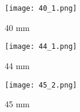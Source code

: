 \begin{figure}[H]
	\centering
	\texttt{[image: 40\_1.png]}
	\caption{40 mm}
\end{figure}

\begin{figure}[H]
	\centering
	\texttt{[image: 44\_1.png]}
	\caption{44 mm}
\end{figure}

\begin{figure}[H]
	\centering
	\texttt{[image: 45\_2.png]}
	\caption{45 mm}
\end{figure}